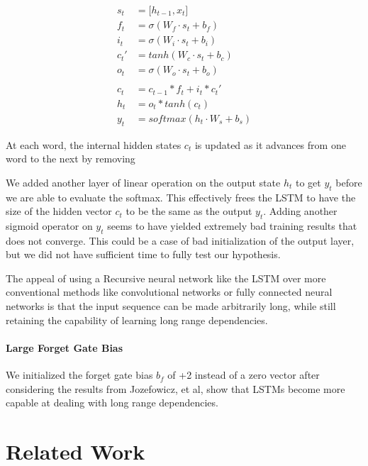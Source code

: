 \documentclass[fyp]{socreport}
\begin{document}
\begin{align*}
  s_t &= \lbrack h_{t-1}, x_{t} \rbrack \\
  f_t &= \sigma \left( W_f \cdot s_t + b_f \right) \\
  i_t &= \sigma \left( W_i \cdot s_t + b_i \right) \\
  c_t' &= tanh \left( W_c \cdot s_t + b_c \right) \\
  o_t &= \sigma \left( W_o \cdot s_t + b_o \right) \\ \\
  c_t &= c_{t-1} * f_t + i_t * c_t' \\
  h_t &= o_t * tanh \left( c_t \right) \\
  y_t &= softmax \left( h_t \cdot W_s + b_s \right)
\end{align*}

At each word, the internal hidden states $c_t$ is updated as it advances from
one word to the next by removing


We added another layer of linear operation on the output state $h_t$ to get
$y_t$ before we are able to evaluate the softmax. This effectively frees the
LSTM to have the size of the hidden vector $c_t$ to be the same as the output
$y_t$. Adding another sigmoid operator on $y_t$ seems to have yielded extremely
bad training results that does not converge. This could be a case of bad
initialization of the output layer, but we did not have sufficient time to
fully test our hypothesis.

The appeal of using a Recursive neural network like the LSTM over more
conventional methods like convolutional networks or fully connected neural
networks is that the input sequence can be made arbitrarily long, while still
retaining the capability of learning long range dependencies.


\subsubsection{Large Forget Gate Bias}
We initialized the forget gate bias $b_f$ of +2 instead of a zero vector after
considering the results from Jozefowicz, et al\cite{ICML2015JozefowiczZS}, show
that LSTMs become more capable at dealing with long range dependencies.


\chapter{Related Work}
\end{document}
